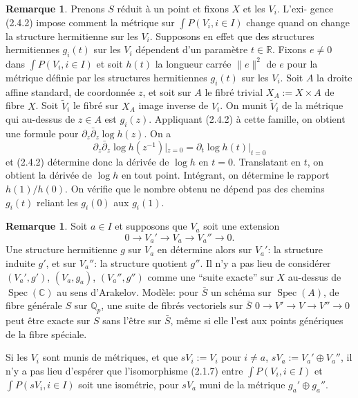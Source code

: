 \documentclass[12pt,a4paper]{article}
\theoremstyle{plain}
\theoremstyle{definition}
\newtheorem{remark}[theorem]{Remarque}
\DeclareMathOperator{\Spec}{Spec}
\newcommand{\QQ}{\mathbb{Q}}
\newcommand{\RR}{\mathbb{R}}
\newcommand{\CC}{\mathbb{C}}
\begin{document}
\begin{remark}
Prenons $S$ r\'eduit \`a un point et fixons $X$ et les $V_i$. L'exi-
gence (2.4.2) impose comment la m\'etrique sur $\int P(V_i, i \in I)$ change quand on
change la structure hermitienne sur les $V_i$. Supposons en effet que des structures
hermitiennes $g_i(t)$ sur les $V_i$ d\'ependent d'un param\`etre $t \in \RR$. Fixons $e \neq
0$ dans $\int P(V_i, i \in I)$ et soit $h(t)$ la longueur carr\'ee $\|e\|^2$ de $e$ pour
la m\'etrique d\'efinie par les structures hermitiennes $g_i(t)$ sur les $V_i$. Soit
$A$ la droite affine standard, de coordonn\'ee $z$, et soit sur $A$ le fibr\'e trivial
$X_A := X \times A$ de fibre $X$. Soit $\tilde{V}_i$ le fibr\'e sur $X_A$ image inverse de $V_i$.
On munit $\tilde{V}_i$ de la m\'etrique qui au-dessus de $z \in A$ est $g_i(z)$. Appliquant
(2.4.2) \`a cette famille, on obtient une formule pour $\partial_z \bar\partial_z \log h(z)$. On a
\[
\partial_z \bar\partial_z \log h(z^{-1})|_{z=0} = \partial_t \log h(t)|_{t=0}
\]
et (2.4.2) d\'etermine donc la d\'eriv\'ee de $\log h$ en $t=0$. Translatant en $t$,
on obtient la d\'eriv\'ee de $\log h$ en tout point. Int\'egrant, on d\'etermine le rapport
$h(1)/h(0)$. On v\'erifie que le nombre obtenu ne d\'epend pas des chemins $g_i(t)$
reliant les $g_i(0)$ aux $g_i(1)$.
\end{remark}

\begin{remark}
Soit $a \in I$ et supposons que $V_a$ soit une extension
\[
0 \to V_a' \to V_a \to V_a'' \to 0 .
\]
Une structure hermitienne $g$ sur $V_a$ en d\'etermine alors sur $V_a'$: la structure
induite $g'$, et sur $V_a''$: la structure quotient $g''$. Il n'y a pas lieu de
consid\'erer $(V_a', g')$, $(V_a, g_a)$, $(V_a'', g'')$ comme une ``suite exacte'' sur $X$
au-dessus de $\Spec(\CC)$ au sens d'Arakelov. Mod\`ele: pour $\bar{S}$ un sch\'ema sur
$\Spec(A)$, de fibre g\'en\'erale $S$ sur $\QQ_p$, une suite de fibr\'es vectoriels sur
$\bar{S}$ $0 \to V' \to V \to V'' \to 0$ peut \^etre exacte sur $S$ sans l'\^etre sur $\bar{S}$, m\^eme si
elle l'est aux points g\'en\'eriques de la fibre sp\'eciale.

Si les $V_i$ sont munis de m\'etriques, et que $sV_i := V_i$ pour $i \neq a$, $sV_a :=
V_a' \oplus V_a''$, il n'y a pas lieu d'esp\'erer que l'isomorphisme (2.1.7) entre $\int P(V_i,
i \in I)$ et $\int P(sV_i, i \in I)$ soit une isom\'etrie, pour $sV_a$ muni de la m\'etrique
$g_a' \oplus g_a''$.
\end{remark}

\subsection{}
\end{document}
